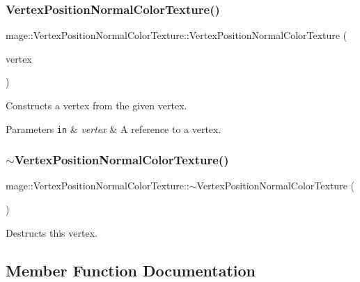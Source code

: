 \subsubsection{\texorpdfstring{Vertex\+Position\+Normal\+Color\+Texture()}{VertexPositionNormalColorTexture()}\hspace{0.1cm}{\footnotesize\ttfamily [4/4]}}
{\footnotesize\ttfamily mage\+::\+Vertex\+Position\+Normal\+Color\+Texture\+::\+Vertex\+Position\+Normal\+Color\+Texture (\begin{DoxyParamCaption}\item[{\hyperlink{structmage_1_1_vertex_position_normal_color_texture}{Vertex\+Position\+Normal\+Color\+Texture} \&\&}]{vertex }\end{DoxyParamCaption})\hspace{0.3cm}{\ttfamily [default]}}

Constructs a vertex from the given vertex.


\begin{DoxyParams}[1]{Parameters}
\mbox{\tt in}  & {\em vertex} & A reference to a vertex. \\
\hline
\end{DoxyParams}
\hypertarget{structmage_1_1_vertex_position_normal_color_texture_af3538a12eab74715dd9b5256f8765162}{}\label{structmage_1_1_vertex_position_normal_color_texture_af3538a12eab74715dd9b5256f8765162} 
\subsubsection{\texorpdfstring{$\sim$\+Vertex\+Position\+Normal\+Color\+Texture()}{~VertexPositionNormalColorTexture()}}
{\footnotesize\ttfamily mage\+::\+Vertex\+Position\+Normal\+Color\+Texture\+::$\sim$\+Vertex\+Position\+Normal\+Color\+Texture (\begin{DoxyParamCaption}{ }\end{DoxyParamCaption})\hspace{0.3cm}{\ttfamily [default]}}

Destructs this vertex. 

\subsection{Member Function Documentation}
\hypertarget{structmage_1_1_vertex_position_normal_color_texture_a2053f5942c404f3d42f6e5a129c3e694}{}\label{structmage_1_1_vertex_position_normal_color_texture_a2053f5942c404f3d42f6e5a129c3e694} 
